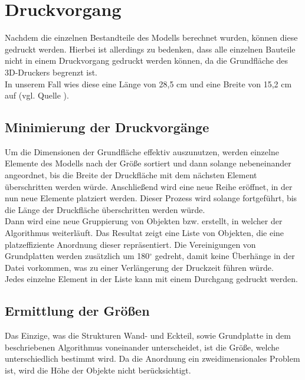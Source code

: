 \section{Druckvorgang}
Nachdem die einzelnen Bestandteile des Modells berechnet wurden, können diese gedruckt werden.
Hierbei ist allerdings zu bedenken, dass alle einzelnen Bauteile nicht in einem Druckvorgang gedruckt werden können, da die Grundfläche des 3D-Druckers begrenzt ist. \\
In unserem Fall wies diese eine Länge von 28,5 cm und eine Breite von 15,2 cm auf (vgl. Quelle \cite{makerbotspecs}).

\subsection{Minimierung der Druckvorgänge}
Um die Dimensionen der Grundfläche effektiv auszunutzen, werden einzelne Elemente des Modells nach der Größe sortiert und dann solange nebeneinander angeordnet, bis die Breite der Druckfläche mit dem nächsten Element überschritten werden würde.
Anschließend wird eine neue Reihe eröffnet, in der nun neue Elemente platziert werden. 
Dieser Prozess wird solange fortgeführt, bis die Länge der Druckfläche überschritten werden würde. \\
Dann wird eine neue Gruppierung von Objekten bzw.  erstellt, in welcher der Algorithmus weiterläuft.
Das Resultat zeigt eine Liste von Objekten, die eine platzeffiziente Anordnung dieser repräsentiert.
Die Vereinigungen von Grundplatten werden zusätzlich um 180$^\circ$ gedreht, damit keine Überhänge in der Datei vorkommen, was zu einer Verlängerung der Druckzeit führen würde.\\
Jedes einzelne Element in der Liste kann mit einem Durchgang gedruckt werden.

\subsection{Ermittlung der Größen}
Das Einzige, was die Strukturen Wand- und Eckteil, sowie Grundplatte in dem beschriebenen Algorithmus voneinander unterscheidet, ist die Größe, welche unterschiedlich bestimmt wird.
Da die Anordnung ein zweidimensionales Problem ist, wird die Höhe der Objekte nicht berücksichtigt.

